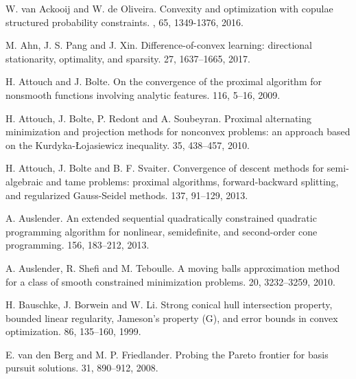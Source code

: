 \documentclass[10pt]{article}
\numberwithin{equation}{section}
\begin{document}
\begin{thebibliography}{99}

{\color{blue} W. van Ackooij and W. de Oliveira.
\newblock Convexity and optimization with copulae
structured probability constraints.
, 65, 1349-1376, 2016.}


M. Ahn, J. S. Pang and J. Xin.
\newblock Difference-of-convex learning: directional stationarity, optimality, and sparsity.
 27, 1637--1665, 2017.


H. Attouch and J. Bolte.
\newblock On the convergence of the proximal algorithm for nonsmooth functions involving analytic features.
 116, 5--16, 2009.

H. Attouch, J. Bolte, P. Redont and A. Soubeyran.
\newblock Proximal alternating minimization and projection methods for nonconvex problems: an approach based on the Kurdyka-{\L}ojasiewicz inequality.
 35, 438--457, 2010.

H. Attouch, J. Bolte and B. F. Svaiter.
\newblock Convergence of descent methods for semi-algebraic and tame problems: proximal algorithms, forward-backward splitting, and regularized Gauss-Seidel methods.
 137, 91--129, 2013.

A. Auslender.
\newblock An extended sequential quadratically constrained quadratic programming algorithm for nonlinear, semidefinite, and second-order cone programming.
 156, 183--212, 2013.

A. Auslender, R. Shefi and M. Teboulle.
\newblock A moving balls approximation method for a class of smooth constrained minimization problems.
 20, 3232--3259, 2010.

H. Bauschke, J. Borwein and W. Li.
\newblock Strong conical hull intersection property, bounded linear regularity, Jameson's property (G), and error bounds in convex optimization.
 86, 135--160, 1999.

E. van den Berg and M. P. Friedlander.
\newblock Probing the Pareto frontier for basis pursuit solutions.
 31, 890--912, 2008.


\end{thebibliography}
\end{document}
